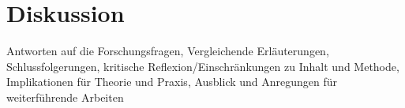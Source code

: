 \section{Diskussion}
\label{diskussion}

Antworten auf die Forschungsfragen, Vergleichende Erläuterungen, 
Schlussfolgerungen, 
kritische Reflexion/Einschränkungen zu Inhalt und Methode, Implikationen für Theorie und Praxis, Ausblick und Anregungen für weiterführende Arbeiten

\lipsum[1]
